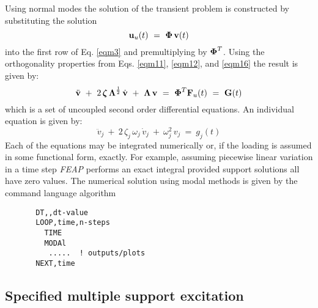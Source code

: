 Using normal modes the solution of the transient problem is constructed
by substituting the solution
\begin{equation}
\label{eqt1}
\mathbf{u}_u(t) ~=~ \boldsymbol{\Phi} \, \mathbf{v}(t)
\end{equation}
into the first row of Eq. \ref{eqm3} and premultiplying by $\boldsymbol{\Phi}^T$.
Using the orthogonality properties from Eqs. \ref{eqm11}, \ref{eqm12},
and \ref{eqm16} the result is given by:
\begin{equation}
\label{eqt2}
\ddot{\mathbf{v}} ~+~ 2 \, \boldsymbol{\zeta} \, \boldsymbol{\Lambda}^\frac{1}{2} \, \dot{\mathbf{v}}
~+~ \boldsymbol{\Lambda} \, \mathbf{v} ~=~ \boldsymbol{\Phi}^T \mathbf{F}_u(t) ~=~ \mathbf{G}(t)
\end{equation}
which is a set of uncoupled second order differential equations.  An individual
equation is given by:
\begin{equation}
\label{eqt3}
\ddot{v}_j ~+~ 2 \, \zeta_j \, \omega_j \, \dot{v}_j ~+~  \omega_j^2 \, v_j
 ~=~ g_j(t)
\end{equation}
Each of the equations may be integrated numerically or, if the loading
is assumed in some functional form, exactly.  For example, assuming piecewise
linear variation in a time step {\sl FEAP} performs an exact integral provided
support solutions all have zero values.  The
numerical solution using modal methods is given by the command language
algorithm
\begin{verbatim}
       DT,,dt-value
       LOOP,time,n-steps
         TIME
         MODAl
          .....  ! outputs/plots
       NEXT,time
\end{verbatim}

\subsection{Specified multiple support excitation}
\label{multis}

